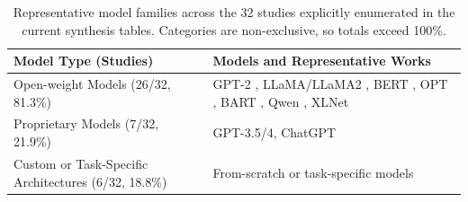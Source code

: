 



\begin{table}[t]
  \centering
  \small
  \caption{Representative model families across the 32 studies explicitly enumerated in the current synthesis tables. Categories are non-exclusive, so totals exceed 100\%.}
  \label{tab:model_families}
  \begin{tabular}{>{\raggedright\arraybackslash}p{4cm} >{\raggedright\arraybackslash}p{9cm}}
    \hline
    \textbf{Model Type (Studies)}                        & \textbf{Models and Representative Works}                          \\
    \hline
    Open-weight Models (26/32, 81.3\%)                   &
    GPT-2 \cite{ding2023discop,pang2024fremax,kaptchuk2021meteor,wang2023hi},
    LLaMA/LLaMA2 \cite{liao2024co,lin2024zero,qi2024provably,li2024semantic},
    BERT \cite{zheng2022general,zhang2024controllable,ding2023joint,ding2023context,ji2024principled,xiang2023cpg,zhang2020linguistic,qiang2023natural,yi2022alisa},
    OPT \cite{munyer2024deeptextmark},
    BART \cite{qiang2023natural,li2023rewriting},
    Qwen \cite{li2024imperceptible,shi2025emotionally},
    XLNet \cite{chen2025cdea}                                                                                                \\
    Proprietary Models (7/32, 21.9\%)                    &
    GPT-3.5/4, ChatGPT
    \cite{xu2024beyond,steinebach2024natural,wu2024generative,hao2025robust,kuznetsov2025deepstego,wozniak2025multicriteria} \\
    Custom or Task-Specific Architectures (6/32, 18.8\%) &
    From-scratch or task-specific models
    \cite{yang2020vae,ding2023joint,ji2024principled,munyer2024deeptextmark,wang2025rsstega,chen2025activetwo}               \\
    \hline
  \end{tabular}
\end{table}




